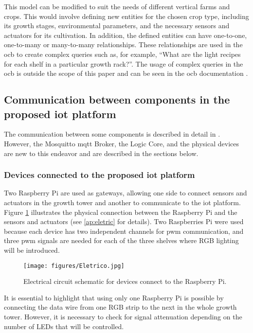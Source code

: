 \documentclass[preprint, review, 12pt]{elsarticle}
\begin{document}
This model can be modified to suit the needs of different vertical farms and crops. This would involve defining new entities for the chosen crop type, including its growth stages, environmental parameters, and the necessary sensors and actuators for its cultivation. In addition, the defined entities can have one-to-one, one-to-many or many-to-many relationships. These relationships are used in the \gls{ocb} to create complex queries such as, for example, ``What are the light recipes for each shelf in a particular growth rack?''. The usage of complex queries in the \gls{ocb} is outside the scope of this paper and can be seen in the \gls{ocb} documentation \cite{fiware-orion}. 

\subsection{Communication between components in the proposed \gls{iot} platform}
\label{sec:communication}

The communication between some components is described in detail in \cite{alves2023}. However, the Mosquitto \gls{mqtt} Broker, the Logic Core, and the physical devices are new to this endeavor and are described in the sections below.

\subsubsection{Devices connected to the proposed \gls{iot} platform}
\label{sec:devices}

Two Raspberry Pi are used as gateways, allowing one side to connect sensors and actuators in the growth tower and another to communicate to the \gls{iot} platform. Figure \ref{fig:esquematic} illustrates the physical connection between the Raspberry Pi and the sensors and actuators (see \ref{ap:eletric} for details).  Two Raspberries Pi were used because each device has two independent channels for \gls{pwm} communication, and three \gls{pwm} signals are needed for each of the three shelves where RGB lighting will be introduced. 


\begin{figure}
    \centering
    \texttt{[image: figures/Eletrico.jpg]}
    \caption{Electrical circuit schematic for devices connect to the Raspberry Pi.}
    \label{fig:esquematic}
\end{figure}

It is essential to highlight that using only one Raspberry Pi is possible by connecting the data wire from one RGB strip to the next in the whole growth tower. However, it is necessary to check for signal attenuation depending on the number of LEDs that will be controlled. 
\end{document}
